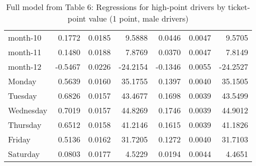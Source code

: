 \documentclass[10pt]{article}
\begin{document}
\begin{table}[ht]
\begin{tabular}{lrrrrrr}
  month-10 & 0.1772 & 0.0185 & 9.5888 & 0.0446 & 0.0047 & 9.5705 \\ 
  month-11 & 0.1480 & 0.0188 & 7.8769 & 0.0370 & 0.0047 & 7.8149 \\ 
  month-12 & -0.5467 & 0.0226 & -24.2154 & -0.1346 & 0.0055 & -24.2527 \\ 
  Monday & 0.5639 & 0.0160 & 35.1755 & 0.1397 & 0.0040 & 35.1505 \\ 
  Tuesday & 0.6826 & 0.0157 & 43.4677 & 0.1698 & 0.0039 & 43.5499 \\ 
  Wednesday & 0.7019 & 0.0157 & 44.8269 & 0.1746 & 0.0039 & 44.9012 \\ 
  Thursday & 0.6512 & 0.0158 & 41.2146 & 0.1615 & 0.0039 & 41.1826 \\ 
  Friday & 0.5136 & 0.0162 & 31.7205 & 0.1272 & 0.0040 & 31.7103 \\ 
  Saturday & 0.0803 & 0.0177 & 4.5229 & 0.0194 & 0.0044 & 4.4651 \\ 
   \hline
\end{tabular}
\caption{Full model from Table 6: Regressions for high-point drivers by ticket-point value (1 point, male drivers)} 
\label{tab_6_1_pts_no_age_M}
\end{table}


\clearpage
\pagebreak



\end{document}
